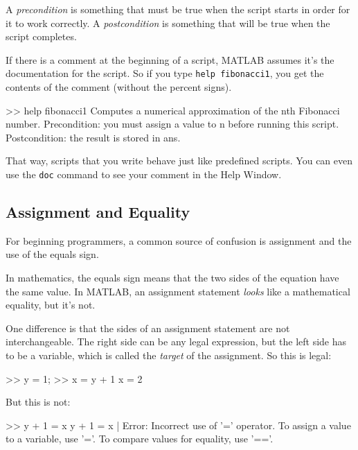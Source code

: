 \documentclass[../../book.tex]{subfiles}
\begin{document}
A \emph{precondition} is something that must be true when the script
starts in order for it to work correctly.  A \emph{postcondition}
is something that will be true when the script completes.


If there is a comment at the beginning of a script, MATLAB assumes
it's the documentation for the script. So if you type \lstinline{help fibonacci1}, you get the contents of the comment (without the percent
signs).

\begin{code}
>> help fibonacci1
  Computes a numerical approximation of the nth Fibonacci number.
  Precondition: you must assign a value to n before running this script.
  Postcondition: the result is stored in ans.
\end{code}

That way, scripts that you write behave just like predefined scripts.
You can even use the \lstinline{doc} command to see your comment in the
Help Window.


\subsection{Assignment and Equality}

For beginning programmers, a common source of confusion is assignment and the use of the equals sign.


In mathematics, the equals sign means that the two sides of the
equation have the same value.
In MATLAB, an assignment statement \emph{looks} like a mathematical equality, but it's not.

One difference is that the sides of an assignment statement are not
interchangeable.  The right side can be any legal expression, but
the left side has to be a variable, which is called the
\emph{target} of the assignment.  So this is legal:

\begin{code}
>> y = 1;
>> x = y + 1
x = 2
\end{code}

But this is not:

\begin{code}
>> y + 1 = x
 y + 1 = x
       |
Error: Incorrect use of '=' operator.
To assign a value to a variable, use '='.
To compare values for equality, use '=='.
\end{code}
\end{document}

